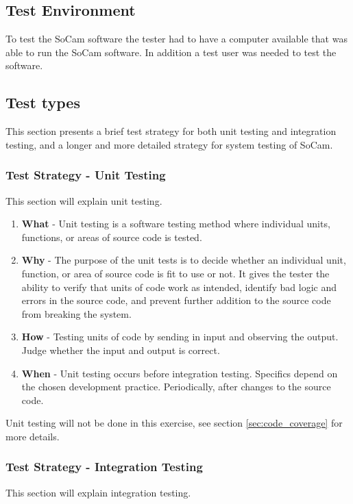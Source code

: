 \subsection{Test Environment}
To test the SoCam software the tester had to have a computer available that was able to run the SoCam software. In addition a test user was needed to test the software. 

\subsection{Test types}

This section presents a brief test strategy for both unit testing and integration testing, and a longer and more detailed strategy for system testing of SoCam.

\subsubsection{Test Strategy - Unit Testing}
This section will explain unit testing.

\begin{enumerate}
    \item \textbf{What} - Unit testing is a software testing method where individual units, functions, or areas of source code is tested.
    \item \textbf{Why} - The purpose of the unit tests is to decide whether an individual unit, function, or area of source code is fit to use or not. It gives the tester the ability to verify that units of code work as intended, identify bad logic and errors in the source code, and prevent further addition to the source code from breaking the system. 
    \item \textbf{How} - Testing units of code by sending in input and observing the output. Judge whether the input and output is correct. 
    \item \textbf{When} - Unit testing occurs before integration testing. Specifics depend on the chosen development practice. Periodically, after changes to the source code. 
\end{enumerate}

\noindent Unit testing will not be done in this exercise, see section \ref{sec:code_coverage} for more details. 

\subsubsection{Test Strategy - Integration Testing}
This section will explain integration testing.


